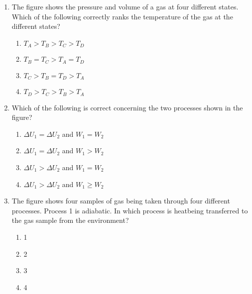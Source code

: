 \documentclass{../../oss-apphys}
\begin{document}
\begin{multicols}{2}
\begin{enumerate}[leftmargin=18pt,start=3]
  \item The figure shows the pressure and volume of a gas at four different
    states. Which of the following correctly ranks the temperature of the gas
    at the different states?
    \begin{enumerate}[noitemsep,topsep=0pt,leftmargin=18pt,label=(\Alph*)]
    \item $T_A>T_B>T_C>T_D$
    \item $T_B=T_C>T_A=T_D$
    \item $T_C>T_B=T_D>T_A$
    \item $T_D>T_C>T_B>T_A$
    \end{enumerate}
  
  \item Which of the following is correct concerning the two processes shown
    in the figure?
    \begin{enumerate}[noitemsep,topsep=0pt,leftmargin=18pt,label=(\Alph*)]
    \item $\Delta U_1 = \Delta U_2$ and $W_1= W_2$
    \item $\Delta U_1 = \Delta U_2$ and $W_1>W_2$
    \item $\Delta U_1 > \Delta U_2$ and $W_1=W_2$
    \item $\Delta U_1 > \Delta U_2$ and $W_1\geq W_2$
    \end{enumerate}
  
  \item The figure shows four samples of gas being taken through four
    different processes. Process 1 is adiabatic. In which process is heatbeing
    transferred to the gas sample from the environment?
    \begin{enumerate}[noitemsep,topsep=0pt,leftmargin=18pt,label=(\Alph*)]
    \item\num{1}
    \item\num{2}
    \item\num{3}
    \item\num{4}
    \end{enumerate}


\end{enumerate}
\end{multicols}
\end{document}
